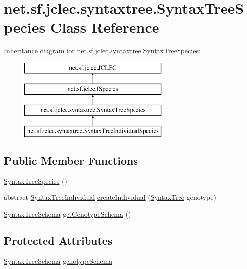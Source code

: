 \hypertarget{classnet_1_1sf_1_1jclec_1_1syntaxtree_1_1_syntax_tree_species}{\section{net.\-sf.\-jclec.\-syntaxtree.\-Syntax\-Tree\-Species Class Reference}
\label{classnet_1_1sf_1_1jclec_1_1syntaxtree_1_1_syntax_tree_species}
}
Inheritance diagram for net.\-sf.\-jclec.\-syntaxtree.\-Syntax\-Tree\-Species\-:\begin{figure}[H]
\begin{center}
\leavevmode
\includegraphics[height=4.000000cm]{classnet_1_1sf_1_1jclec_1_1syntaxtree_1_1_syntax_tree_species}
\end{center}
\end{figure}
\subsection*{Public Member Functions}
\begin{DoxyCompactItemize}
\item 
\hyperlink{classnet_1_1sf_1_1jclec_1_1syntaxtree_1_1_syntax_tree_species_a83f5c96ee5218aa6e77ee8ffef5e2b70}{Syntax\-Tree\-Species} ()
\item 
abstract \hyperlink{classnet_1_1sf_1_1jclec_1_1syntaxtree_1_1_syntax_tree_individual}{Syntax\-Tree\-Individual} \hyperlink{classnet_1_1sf_1_1jclec_1_1syntaxtree_1_1_syntax_tree_species_a6e29c0daa2bec3fc99ec514257b4b0ca}{create\-Individual} (\hyperlink{classnet_1_1sf_1_1jclec_1_1syntaxtree_1_1_syntax_tree}{Syntax\-Tree} genotype)
\item 
\hyperlink{classnet_1_1sf_1_1jclec_1_1syntaxtree_1_1_syntax_tree_schema}{Syntax\-Tree\-Schema} \hyperlink{classnet_1_1sf_1_1jclec_1_1syntaxtree_1_1_syntax_tree_species_a4fb9aa6cace2a829543d911a06fb99f4}{get\-Genotype\-Schema} ()
\end{DoxyCompactItemize}
\subsection*{Protected Attributes}
\begin{DoxyCompactItemize}
\item 
\hyperlink{classnet_1_1sf_1_1jclec_1_1syntaxtree_1_1_syntax_tree_schema}{Syntax\-Tree\-Schema} \hyperlink{classnet_1_1sf_1_1jclec_1_1syntaxtree_1_1_syntax_tree_species_a57052e3231f5b00e8f39ca343ea2131b}{genotype\-Schema}
\end{DoxyCompactItemize}


